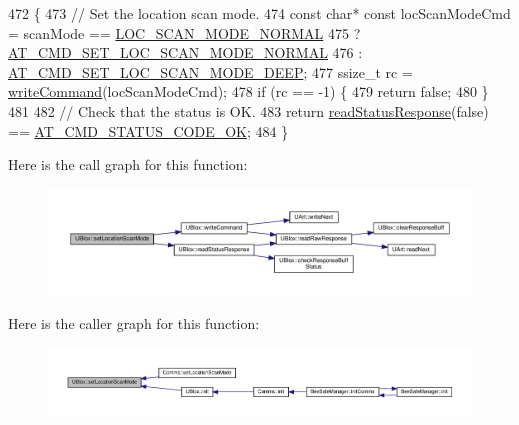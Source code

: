 \begin{DoxyCode}
472 \{
473     \textcolor{comment}{// Set the location scan mode.}
474     \textcolor{keyword}{const} \textcolor{keywordtype}{char}* \textcolor{keyword}{const} locScanModeCmd = scanMode == \hyperlink{_u_blox_8h_a57e74368f6c6813ceb64f972eba4a5f3}{LOC\_SCAN\_MODE\_NORMAL}
475                                        ? \hyperlink{_u_blox_8cpp_a70bd8532253bd43bd141f2414fba190c}{AT\_CMD\_SET\_LOC\_SCAN\_MODE\_NORMAL}
476                                        : \hyperlink{_u_blox_8cpp_a7862985fe9289d8f07cd461ed60c1986}{AT\_CMD\_SET\_LOC\_SCAN\_MODE\_DEEP};
477     ssize\_t rc = \hyperlink{class_u_blox_af604d1897a66192bf1c2a11997f2634d}{writeCommand}(locScanModeCmd);
478     \textcolor{keywordflow}{if} (rc == -1) \{
479         \textcolor{keywordflow}{return} \textcolor{keyword}{false};
480     \}
481 
482     \textcolor{comment}{// Check that the status is OK.}
483     \textcolor{keywordflow}{return} \hyperlink{class_u_blox_a4eaca5b1b1c4b5b6f6164b220dd43e0b}{readStatusResponse}(\textcolor{keyword}{false}) == \hyperlink{_u_blox_8cpp_a6ebc1682eb6b9964fccb4a61688ff307}{AT\_CMD\_STATUS\_CODE\_OK};
484 \}
\end{DoxyCode}
Here is the call graph for this function\+:\nopagebreak
\begin{figure}[H]
\begin{center}
\leavevmode
\includegraphics[width=350pt]{da/df6/class_u_blox_aabed44fd41e16c9d1a8daba80f3bef06_cgraph}
\end{center}
\end{figure}
Here is the caller graph for this function\+:\nopagebreak
\begin{figure}[H]
\begin{center}
\leavevmode
\includegraphics[width=350pt]{da/df6/class_u_blox_aabed44fd41e16c9d1a8daba80f3bef06_icgraph}
\end{center}
\end{figure}
\mbox{\label{class_u_blox_a12c1042d3bcb503b025927fd53d54243}} 
